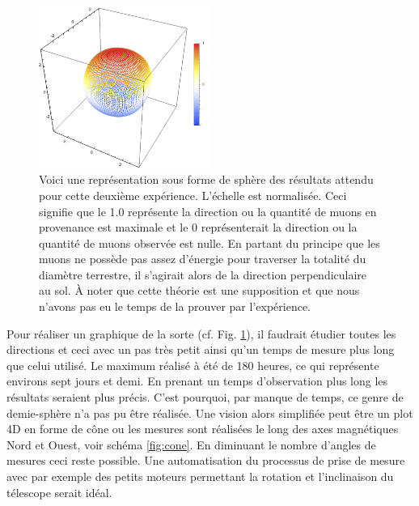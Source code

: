 \documentclass[12pt]{article}
\begin{document}
\begin{figure}
    \centering
    \includegraphics[width=0.5\textwidth]{graphiques/experience2/resultat_telescope_muon.png}
    \captionsetup{width=0.8\textwidth}
    \caption{Voici une représentation sous forme de sphère des résultats attendu pour cette deuxième expérience. L'échelle est normalisée. Ceci signifie que le 1.0 représente la direction ou la quantité de muons en provenance est maximale et le 0 représenterait la direction ou la quantité de muons observée est nulle. En partant du principe que les muons ne possède pas assez d'énergie pour traverser la totalité du diamètre terrestre, il s'agirait alors de la direction perpendiculaire au sol. À noter que cette théorie est une supposition et que nous n'avons pas eu le temps de la prouver par l'expérience.}
    \label{resultat_telescope_muon}
\end{figure}

Pour réaliser un graphique de la sorte (cf. Fig. \ref{resultat_telescope_muon}), il faudrait étudier toutes les directions et ceci avec un pas très petit ainsi qu'un temps de mesure plus long que celui utilisé. Le maximum réalisé à été de 180 heures, ce qui représente environs sept jours et demi. En prenant un temps d'observation plus long les résultats seraient plus précis. C'est pourquoi, par manque de temps, ce genre de demie-sphère n'a pas pu 
être réalisée. Une vision alors simplifiée peut être un plot 4D en forme de cône ou les mesures sont réalisées le long des axes magnétiques Nord et Ouest, voir schéma \ref{fig:cone}. En diminuant le nombre d'angles de mesures ceci reste possible. Une automatisation du processus de prise de mesure avec par exemple des petits moteurs permettant la rotation et l'inclinaison du télescope serait idéal.
\end{document}
